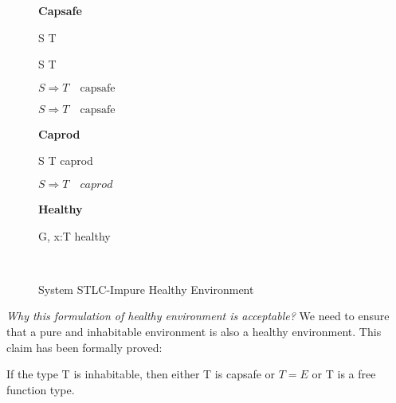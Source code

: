 \begin{figure}[h]
\begin{framed}

\setlength{\columnseprule}{0.4pt}
\begin{multicols}{2}

\textbf{Capsafe}


{ S \to T \quad {} }

{ S \to T \quad {} }

{ \colorbox{shade}{$S \Rightarrow T \quad \text{capsafe}$} }

{ \colorbox{shade}{$S \Rightarrow T \quad \text{capsafe}$} }

\columnbreak

\textbf{Caprod}


{ S \to T \quad caprod }

{ \colorbox{shade}{$S \Rightarrow T \quad caprod$} }

\textbf{Healthy}


{ G, \; x:T \quad healthy }

\hfill\\

\end{multicols}
\end{framed}

\caption{System STLC-Impure Healthy Environment}
\label{fig:stlc-impure-healthy-definition}
\end{figure}

\emph{Why this formulation of healthy environment is acceptable?} We
need to ensure that a pure and inhabitable environment is also a
healthy environment. This claim has been formally proved:

\begin{lemma}
  If the type T is inhabitable, then either T is capsafe or $T = E$ or
  T is a free function type.
\end{lemma}

